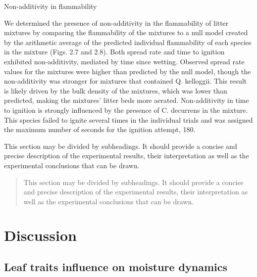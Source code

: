 \documentclass[fire,article,submit,moreauthors,pdftex]{Definitions/mdpi}
\begin{document}
Non-additivity in flammability

We determined the presence of non-additivity in the flammability of litter mixtures by comparing the flammability of the mixtures to a null model created by the arithmetic average of the predicted individual flammability of each species in the mixture (Figs. 2.7 and 2.8). Both spread rate and time to ignition exhibited non-additivity, mediated by time since wetting. Observed spread rate values for the mixtures were higher than predicted by the null model, though the non-additivity was stronger for mixtures that contained Q. kelloggii. This result is likely driven by the bulk density of the mixtures, which was lower than predicted, making the mixtures’ litter beds more aerated. Non-additivity in time to ignition is strongly influenced by the presence of C. decurrens in the mixture. This species failed to ignite several times in the individual trials and was assigned the maximum number of seconds for the ignition attempt, 180.



This section may be divided by subheadings. It should provide a concise and precise description of the experimental results, their interpretation as well as the experimental conclusions that can be drawn.
\begin{quote}
This section may be divided by subheadings. It should provide a concise and precise description of the experimental results, their interpretation as well as the experimental conclusions that can be drawn.
\end{quote}



\section{Discussion}

\subsection{Leaf traits influence on moisture dynamics }
\end{document}
